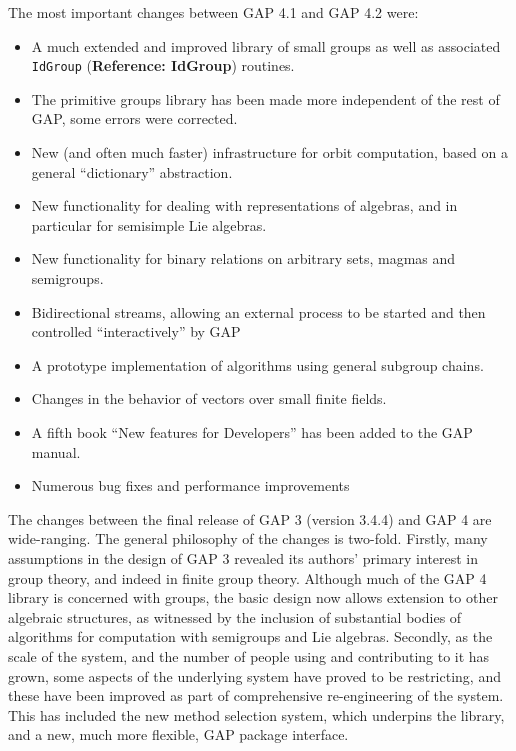 \documentclass[a4paper,11pt]{report}
\begin{document}
{{\begin{itemize}
 
\end{itemize}
 

 The most important changes between \textsf{GAP} 4.1 and \textsf{GAP} 4.2 were: 

 
\begin{itemize}
\item  A much extended and improved library of small groups as well as associated \texttt{IdGroup} (\textbf{Reference: IdGroup}) routines. 
\item  The primitive groups library has been made more independent of the rest of \textsf{GAP}, some errors were corrected. 
\item  New (and often much faster) infrastructure for orbit computation, based on a
general ``dictionary'' abstraction. 
\item  New functionality for dealing with representations of algebras, and in
particular for semisimple Lie algebras. 
\item  New functionality for binary relations on arbitrary sets, magmas and
semigroups. 
\item  Bidirectional streams, allowing an external process to be started and then
controlled ``interactively'' by \textsf{GAP} 
\item  A prototype implementation of algorithms using general subgroup chains. 
\item  Changes in the behavior of vectors over small finite fields. 
\item  A fifth book ``New features for Developers'' has been added to the \textsf{GAP} manual. 
\item  Numerous bug fixes and performance improvements 
\end{itemize}
 

 The changes between the final release of \textsf{GAP} 3 (version 3.4.4) and \textsf{GAP} 4 are wide-ranging. The general philosophy of the changes is two-fold.
Firstly, many assumptions in the design of \textsf{GAP} 3 revealed its authors' primary interest in group theory, and indeed in finite
group theory. Although much of the \textsf{GAP} 4 library is concerned with groups, the basic design now allows extension to
other algebraic structures, as witnessed by the inclusion of substantial
bodies of algorithms for computation with semigroups and Lie algebras.
Secondly, as the scale of the system, and the number of people using and
contributing to it has grown, some aspects of the underlying system have
proved to be restricting, and these have been improved as part of
comprehensive re-engineering of the system. This has included the new method
selection system, which underpins the library, and a new, much more flexible, \textsf{GAP} package interface. 

}}
\end{document}
